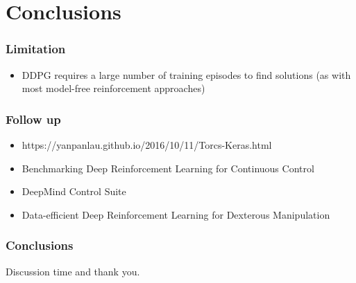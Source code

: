 \section{Conclusions}

\begin{frame}
\frametitle{Limitation}
\begin{itemize}
  \item DDPG requires a large number of training episodes to find solutions
  (as with most model-free reinforcement approaches)
\end{itemize}
\end{frame}

\begin{frame}
\frametitle{Follow up}
\begin{itemize}
\item https://yanpanlau.github.io/2016/10/11/Torcs-Keras.html
\item Benchmarking Deep Reinforcement Learning for Continuous Control
\item DeepMind Control Suite
\item Data-efficient Deep Reinforcement Learning for Dexterous Manipulation
\end{itemize}
\end{frame}

\begin{frame}
\frametitle{Conclusions}

\end{frame}

\begin{frame}
\Huge{\centerline{Discussion time and thank you.}}
\end{frame}

